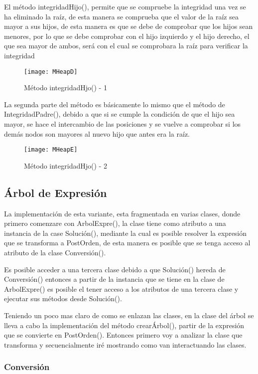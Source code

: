 \documentclass[12pt,a4paper]{article}
\begin{document}
	El método integridadHijo(), permite que se compruebe la integridad una vez se ha eliminado la raíz, de esta manera se comprueba que el valor de la raíz sea mayor a sus hijos, de esta manera es que se debe de comprobar que los hijos sean  menores, por lo que se debe comprobar con el hijo  izquierdo y el hijo derecho, el que sea mayor de ambos, será con el cual se comprobara la raíz para verificar la integridad


		\begin{figure}[h]
			\centering
			\texttt{[image: MHeapD]}
			\caption{Método integridadHjo() - 1}
		\end{figure}
		
	La segunda parte del  método es básicamente lo mismo que el método de IntegridadPadre(), debido a que si se cumple la condición de que el hijo sea mayor, se hace el intercambio de las posiciones y se vuelve a comprobar si los demás nodos son mayores al nuevo hijo que antes era la raíz. 
	
		\begin{figure}[h]
			\centering
			\texttt{[image: MHeapE]}
			\caption{Método integridadHjo() - 2}
		\end{figure}
		
		\subsection{Árbol de Expresión}
		
	La implementación de esta variante, esta fragmentada en varias clases, donde primero comenzare con ArbolExpre(), la clase tiene como atributo a una instancia de la case Solución(), mediante la cual es posible resolver la expresión que se transforma a PostOrden, de esta manera es posible que se tenga acceso al atributo de la clase Conversión().
	
	Es posible acceder a una tercera clase debido a que Solución() hereda de Conversión() entonces   a partir de la instancia que se tiene en la clase de ArbolExpre() es posible el tener acceso a los atributos de una tercera clase y ejecutar sus métodos desde Solución().
	
	Teniendo un poco mas claro de como se enlazan las clases, en la clase del árbol se lleva a cabo la implementación del método crearÁrbol(),  partir de la expresión que se convierte en PostOrden(). Entonces primero voy a analizar la clase que transforma y secuencialmente iré mostrando como van interactuando las clases.

			\subsubsection{Conversión}
			
\end{document}
